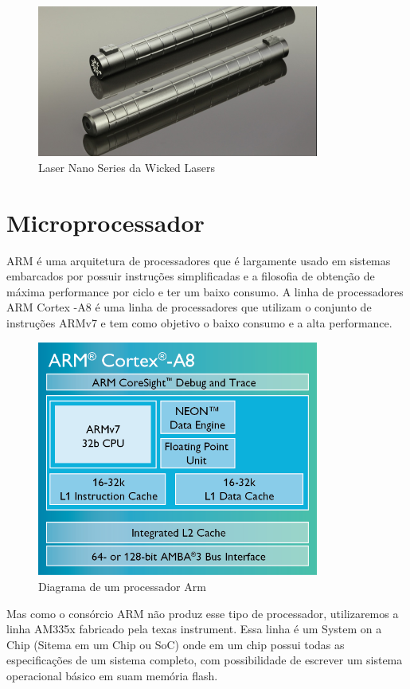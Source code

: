 \begin{figure}[h]
  \centering
  \includegraphics[width=350px, scale=1]{figuras/laser_nano}
  \caption{Laser Nano Series da Wicked Lasers}
\label{fig:laser_nano}
\end{figure}

\section{Microprocessador}

ARM é uma arquitetura de processadores que é largamente usado em sistemas embarcados por possuir instruções simplificadas e a filosofia de obtenção de máxima performance por ciclo e ter um baixo consumo. A linha de processadores ARM Cortex -A8 é uma linha de processadores que utilizam o conjunto de instruções ARMv7 e tem como objetivo o baixo consumo e a alta performance.

\begin{figure}[h]
  \centering
  \includegraphics[width=350px, scale=1]{figuras/arm}
  \caption{Diagrama de um processador Arm}
\label{fig:arm}
\end{figure}

Mas como o consórcio ARM não produz esse tipo de processador, utilizaremos a linha AM335x fabricado pela texas instrument. Essa linha é um System on a Chip (Sitema em um Chip ou SoC) onde em um chip possui todas as especificações de um sistema completo, com possibilidade de escrever um sistema operacional básico em suam memória flash.

